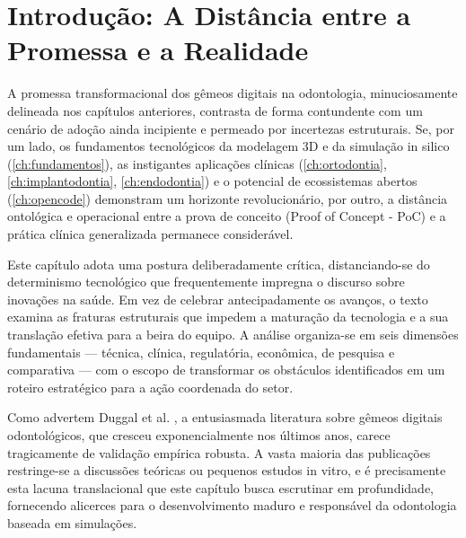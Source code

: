 \section{Introdução: A Distância entre a Promessa e a Realidade}

A promessa transformacional dos gêmeos digitais na odontologia, minuciosamente delineada nos capítulos anteriores, contrasta de forma contundente com um cenário de adoção ainda incipiente e permeado por incertezas estruturais. Se, por um lado, os fundamentos tecnológicos da modelagem 3D e da simulação in silico (\autoref{ch:fundamentos}), as instigantes aplicações clínicas (\autoref{ch:ortodontia}, \autoref{ch:implantodontia}, \autoref{ch:endodontia}) e o potencial de ecossistemas abertos (\autoref{ch:opencode}) demonstram um horizonte revolucionário, por outro, a distância ontológica e operacional entre a prova de conceito (Proof of Concept - PoC) e a prática clínica generalizada permanece considerável.

Este capítulo adota uma postura deliberadamente crítica, distanciando-se do determinismo tecnológico que frequentemente impregna o discurso sobre inovações na saúde. Em vez de celebrar antecipadamente os avanços, o texto examina as fraturas estruturais que impedem a maturação da tecnologia e a sua translação efetiva para a beira do equipo. A análise organiza-se em seis dimensões fundamentais — técnica, clínica, regulatória, econômica, de pesquisa e comparativa — com o escopo de transformar os obstáculos identificados em um roteiro estratégico para a ação coordenada do setor. 

Como advertem Duggal et al. \cite{duggal2026exploring}, a entusiasmada literatura sobre gêmeos digitais odontológicos, que cresceu exponencialmente nos últimos anos, carece tragicamente de validação empírica robusta. A vasta maioria das publicações restringe-se a discussões teóricas ou pequenos estudos in vitro, e é precisamente esta lacuna translacional que este capítulo busca escrutinar em profundidade, fornecendo alicerces para o desenvolvimento maduro e responsável da odontologia baseada em simulações.

